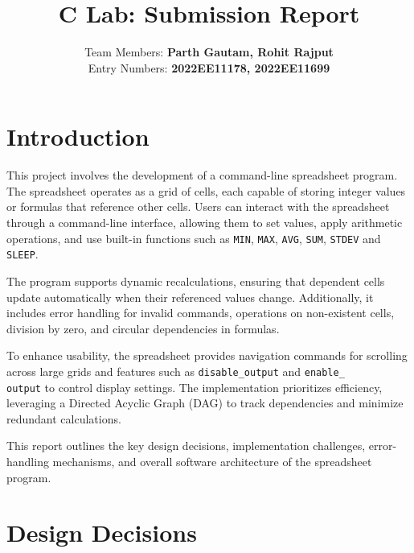 \documentclass[a4paper,12pt]{article}
\title{C Lab: Submission Report}
\author{Team Members: \textbf{Parth Gautam, Rohit Rajput}\\ Entry Numbers: \textbf{2022EE11178, 2022EE11699}}
\date{}
\begin{document}
\maketitle

\section{Introduction}

This project involves the development of a command-line spreadsheet program. The spreadsheet operates as a grid of cells, each capable of storing integer values or formulas that reference other cells. Users can interact with the spreadsheet through a command-line interface, allowing them to set values, apply arithmetic operations, and use built-in functions such as \texttt{MIN}, \texttt{MAX}, \texttt{AVG}, \texttt{SUM}, \texttt{STDEV} and \texttt{SLEEP}.  

The program supports dynamic recalculations, ensuring that dependent cells update automatically when their referenced values change. Additionally, it includes error handling for invalid commands, operations on non-existent cells, division by zero, and circular dependencies in formulas.  

To enhance usability, the spreadsheet provides navigation commands for scrolling across large grids and features such as \texttt{disable\_output} and \texttt{enable\_\\output} to control display settings. The implementation prioritizes efficiency, leveraging a Directed Acyclic Graph (DAG) to track dependencies and minimize redundant calculations.  

This report outlines the key design decisions, implementation challenges, error-handling mechanisms, and overall software architecture of the spreadsheet program.  

\section{Design Decisions}
\end{document}
